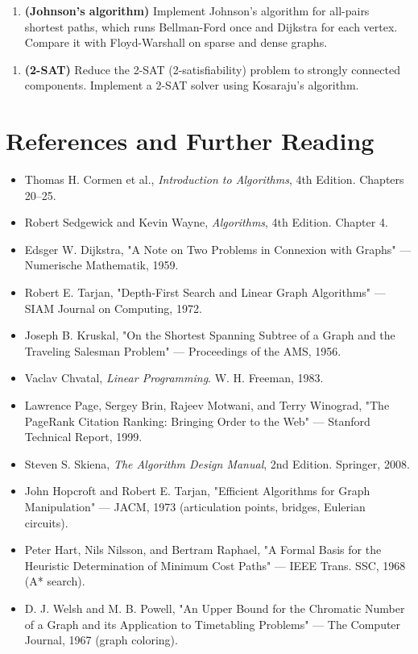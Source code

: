 \begin{enumerate}
\item \textbf{(Johnson's algorithm)} Implement Johnson's algorithm for all-pairs shortest paths, which runs Bellman-Ford once and Dijkstra for each vertex. Compare it with Floyd-Warshall on sparse and dense graphs.
\end{enumerate}

\begin{enumerate}
\item \textbf{(2-SAT)} Reduce the 2-SAT (2-satisfiability) problem to strongly connected components. Implement a 2-SAT solver using Kosaraju's algorithm.
\end{enumerate}

\section{References and Further Reading}

\begin{itemize}
\item Thomas H. Cormen et al., \textit{Introduction to Algorithms}, 4th Edition. Chapters 20–25.
\item Robert Sedgewick and Kevin Wayne, \textit{Algorithms}, 4th Edition. Chapter 4.
\item Edsger W. Dijkstra, "A Note on Two Problems in Connexion with Graphs" — Numerische Mathematik, 1959.
\item Robert E. Tarjan, "Depth-First Search and Linear Graph Algorithms" — SIAM Journal on Computing, 1972.
\item Joseph B. Kruskal, "On the Shortest Spanning Subtree of a Graph and the Traveling Salesman Problem" — Proceedings of the AMS, 1956.
\item Vaclav Chvatal, \textit{Linear Programming}. W. H. Freeman, 1983.
\item Lawrence Page, Sergey Brin, Rajeev Motwani, and Terry Winograd, "The PageRank Citation Ranking: Bringing Order to the Web" — Stanford Technical Report, 1999.
\item Steven S. Skiena, \textit{The Algorithm Design Manual}, 2nd Edition. Springer, 2008.
\item John Hopcroft and Robert E. Tarjan, "Efficient Algorithms for Graph Manipulation" — JACM, 1973 (articulation points, bridges, Eulerian circuits).
\item Peter Hart, Nils Nilsson, and Bertram Raphael, "A Formal Basis for the Heuristic Determination of Minimum Cost Paths" — IEEE Trans. SSC, 1968 (A* search).
\item D. J. Welsh and M. B. Powell, "An Upper Bound for the Chromatic Number of a Graph and its Application to Timetabling Problems" — The Computer Journal, 1967 (graph coloring).
\end{itemize}
